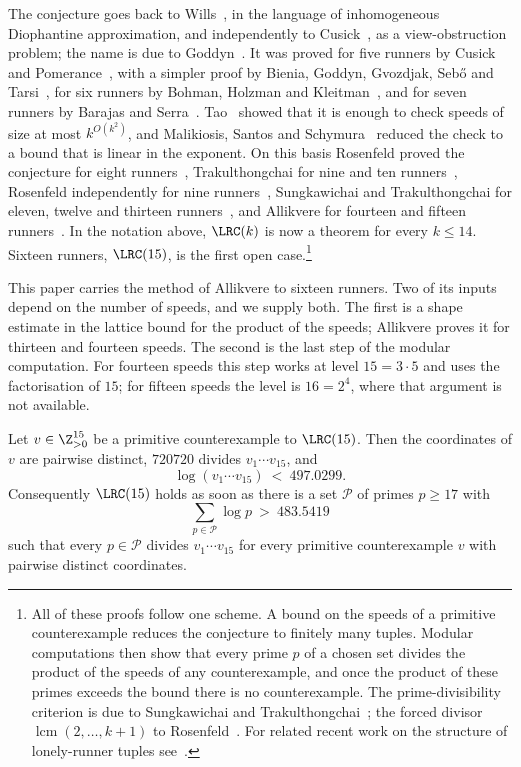 The conjecture goes back to Wills~\cite{Wil67}, in the language of
inhomogeneous Diophantine approximation, and independently to
Cusick~\cite{Cus73}, as a view-obstruction problem; the name is due to
Goddyn~\cite{BGGST98}. It was proved for five runners by Cusick and
Pomerance~\cite{CP84}, with a simpler proof by Bienia, Goddyn, Gvozdjak,
Seb\H{o} and Tarsi~\cite{BGGST98}, for six runners by Bohman, Holzman and
Kleitman~\cite{BHK01}, and for seven runners by Barajas and
Serra~\cite{BS08}. Tao~\cite{Tao18} showed that it is enough to check
speeds of size at most $k^{O(k^2)}$, and Malikiosis, Santos and
Schymura~\cite{MSS25} reduced the check to a bound that is linear in the
exponent. On this basis Rosenfeld proved the conjecture for eight
runners~\cite{Ros26a}, Trakulthongchai for nine and ten
runners~\cite{Tra26}, Rosenfeld independently for nine
runners~\cite{Ros26b}, Sungkawichai and Trakulthongchai for eleven, twelve
and thirteen runners~\cite{ST26}, and Allikvere for fourteen and fifteen
runners~\cite{All26}. In the notation above, $\LRC(k)$ is now a theorem for
every $k\le 14$. Sixteen runners, $\LRC(15)$, is the first open
case.\footnote{All of these proofs follow one scheme. A bound on the speeds
of a primitive counterexample reduces the conjecture to finitely many
tuples. Modular computations then show that every prime $p$ of a chosen set
divides the product of the speeds of any counterexample, and once the
product of these primes exceeds the bound there is no counterexample. The
prime-divisibility criterion is due to Sungkawichai and
Trakulthongchai~\cite{ST26}; the forced divisor $\operatorname{lcm}(2,\dots,k+1)$
to Rosenfeld~\cite[Lemma~4]{Ros26a}. For related recent work on the
structure of lonely-runner tuples see~\cite{GK26,BCS26,PS24}.}

This paper carries the method of Allikvere to sixteen runners. Two of its
inputs depend on the number of speeds, and we supply both. The first is a
shape estimate in the lattice bound for the product of the speeds; Allikvere
proves it for thirteen and fourteen speeds. The second is the last step of
the modular computation. For fourteen speeds this step works at level
$15=3\cdot5$ and uses the factorisation of $15$; for fifteen speeds the
level is $16=2^4$, where that argument is not available.

\begin{theorem}\label{thm:bound}
Let $v\in\Z_{>0}^{15}$ be a primitive counterexample to $\LRC(15)$. Then the
coordinates of $v$ are pairwise distinct, $720720$ divides
$v_1\cdots v_{15}$, and
\[
 \log(v_1\cdots v_{15})\ <\ 497.0299 .
\]
Consequently $\LRC(15)$ holds as soon as there is a set $\mathcal P$ of
primes $p\ge17$ with
\[
 \sum_{p\in\mathcal P}\log p\ >\ 483.5419
\]
such that every $p\in\mathcal P$ divides $v_1\cdots v_{15}$ for every
primitive counterexample $v$ with pairwise distinct coordinates.
\end{theorem}

